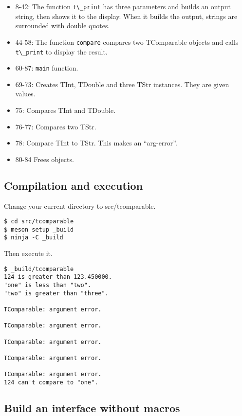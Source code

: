 \begin{itemize}
\tightlist
\item
  8-42: The function \passthrough{\lstinline!t\_print!} has three
  parameters and builds an output string, then shows it to the display.
  When it builds the output, strings are surrounded with double quotes.
\item
  44-58: The function \passthrough{\lstinline!compare!} compares two
  TComparable objects and calls \passthrough{\lstinline!t\_print!} to
  display the result.
\item
  60-87: \passthrough{\lstinline!main!} function.
\item
  69-73: Creates TInt, TDouble and three TStr instances. They are given
  values.
\item
  75: Compares TInt and TDouble.
\item
  76-77: Compares two TStr.
\item
  78: Compare TInt to TStr. This makes an ``arg-error''.
\item
  80-84 Frees objects.
\end{itemize}

\subsection{Compilation and execution}\label{compilation-and-execution}

Change your current directory to src/tcomparable.

\begin{lstlisting}
$ cd src/tcomparable
$ meson setup _build
$ ninja -C _build
\end{lstlisting}

Then execute it.

\begin{lstlisting}
$ _build/tcomparable
124 is greater than 123.450000.
"one" is less than "two".
"two" is greater than "three".

TComparable: argument error.

TComparable: argument error.

TComparable: argument error.

TComparable: argument error.

TComparable: argument error.
124 can't compare to "one".
\end{lstlisting}

\subsection{Build an interface without
macros}\label{build-an-interface-without-macros}


